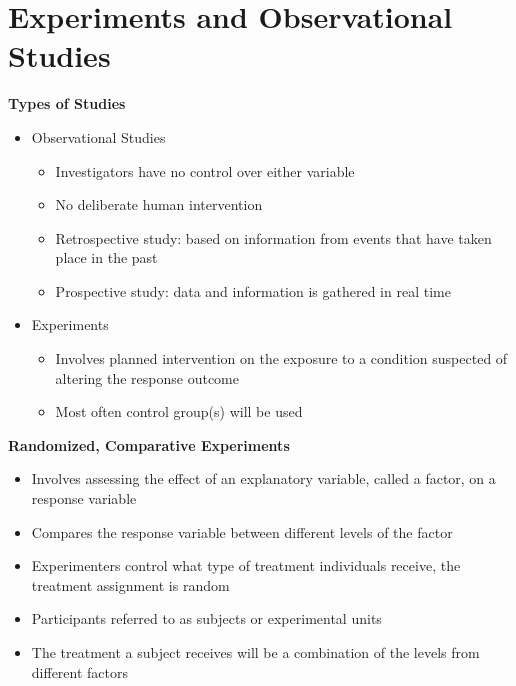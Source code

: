 \documentclass{article}
\begin{document}
\section{Experiments and Observational Studies}

\textbf{Types of Studies}
\begin{itemize}
    \item Observational Studies
    \begin{itemize}
        \item Investigators have no control over either variable
        \item No deliberate human intervention 
        \item Retrospective study: based on information from events that have taken place in the past
        \item Prospective study: data and information is gathered in real time
    \end{itemize}
    \item Experiments 
    \begin{itemize}
        \item Involves planned intervention on the exposure to a condition suspected of altering the response outcome
        \item Most often control group(s) will be used
    \end{itemize}
\end{itemize}

\noindent
\textbf{Randomized, Comparative Experiments}
\begin{itemize}
    \item Involves assessing the effect of an explanatory variable, called a factor, on a response variable
    \item Compares the response variable between different levels of the factor
    \item Experimenters control what type of treatment individuals receive, the treatment assignment is random
    \item Participants referred to as subjects or experimental units
    \item The treatment a subject receives will be a combination of the levels from different factors 
\end{itemize}
\end{document}
